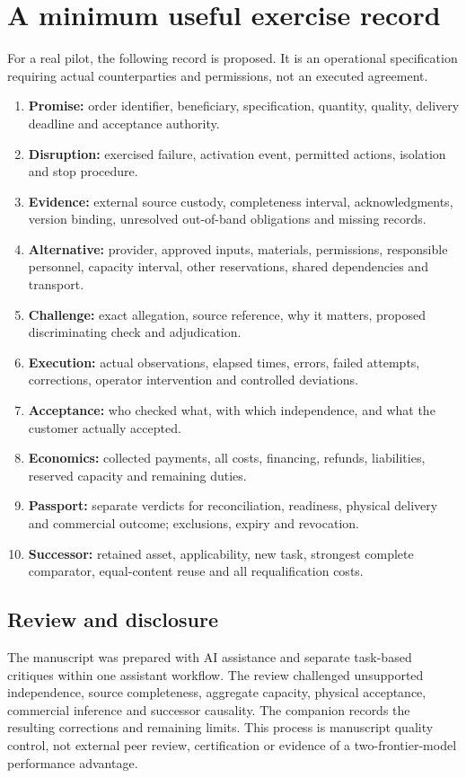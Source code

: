 \documentclass[11pt,a4paper]{article}
\newcommand{\chapterpage}{\clearpage}
\begin{document}
\chapterpage
\section{A minimum useful exercise record}\label{app:record}
For a real pilot, the following record is proposed. It is an operational specification requiring actual counterparties and permissions, not an executed agreement.
\begin{enumerate}
\item \textbf{Promise:} order identifier, beneficiary, specification, quantity, quality, delivery deadline and acceptance authority.
\item \textbf{Disruption:} exercised failure, activation event, permitted actions, isolation and stop procedure.
\item \textbf{Evidence:} external source custody, completeness interval, acknowledgments, version binding, unresolved out-of-band obligations and missing records.
\item \textbf{Alternative:} provider, approved inputs, materials, permissions, responsible personnel, capacity interval, other reservations, shared dependencies and transport.
\item \textbf{Challenge:} exact allegation, source reference, why it matters, proposed discriminating check and adjudication.
\item \textbf{Execution:} actual observations, elapsed times, errors, failed attempts, corrections, operator intervention and controlled deviations.
\item \textbf{Acceptance:} who checked what, with which independence, and what the customer actually accepted.
\item \textbf{Economics:} collected payments, all costs, financing, refunds, liabilities, reserved capacity and remaining duties.
\item \textbf{Passport:} separate verdicts for reconciliation, readiness, physical delivery and commercial outcome; exclusions, expiry and revocation.
\item \textbf{Successor:} retained asset, applicability, new task, strongest complete comparator, equal-content reuse and all requalification costs.
\end{enumerate}

\subsection*{Review and disclosure}
The manuscript was prepared with AI assistance and separate task-based critiques within one assistant workflow. The review challenged unsupported independence, source completeness, aggregate capacity, physical acceptance, commercial inference and successor causality. The companion records the resulting corrections and remaining limits. This process is manuscript quality control, not external peer review, certification or evidence of a two-frontier-model performance advantage.
\end{document}
